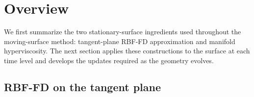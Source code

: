 \documentclass[a4paper,fleqn]{cas-sc}
\begin{document}




\section{Overview}
\label{sec:overview}

We first summarize the two stationary-surface ingredients used throughout the
moving-surface method: tangent-plane RBF-FD approximation and manifold hyperviscosity.  The next
section applies these constructions to the surface at each time level and
develops the updates required as the geometry evolves.

\subsection{RBF-FD on the tangent plane}
\label{subsec:overview-tangent-rbffd}
\end{document}
